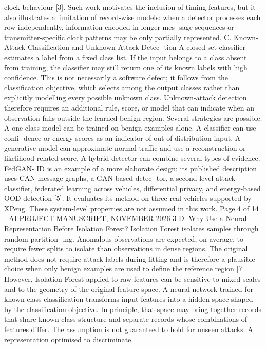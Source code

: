 \documentclass[
]{article}
\begin{document}
clock behaviour {[}3{]}. Such work motivates the inclusion of timing
features, but it also illustrates a limitation of record-wise models:
when a detector processes each row independently, information encoded in
longer mes- sage sequences or transmitter-specific clock patterns may be
only partially represented. C. Known-Attack Classification and
Unknown-Attack Detec- tion A closed-set classifier estimates a label
from a fixed class list. If the input belongs to a class absent from
training, the classifier may still return one of its known labels with
high confidence. This is not necessarily a software defect; it follows
from the classification objective, which selects among the output
classes rather than explicitly modelling every possible unknown class.
Unknown-attack detection therefore requires an additional rule, score,
or model that can indicate when an observation falls outside the learned
benign region. Several strategies are possible. A one-class model can be
trained on benign examples alone. A classifier can use confi- dence or
energy scores as an indicator of out-of-distribution input. A generative
model can approximate normal traffic and use a reconstruction or
likelihood-related score. A hybrid detector can combine several types of
evidence. FedGAN- ID is an example of a more elaborate design: its
published description uses CAN-message graphs, a GAN-based detec- tor, a
second-level attack classifier, federated learning across vehicles,
differential privacy, and energy-based OOD detection {[}5{]}. It
evaluates its method on three real vehicles supported by XPeng. These
system-level properties are not assumed in this work. Page 4 of 14 - AI
PROJECT MANUSCRIPT, NOVEMBER 2026 3 D. Why Use a Neural Representation
Before Isolation Forest? Isolation Forest isolates samples through
random partition- ing. Anomalous observations are expected, on average,
to require fewer splits to isolate than observations in dense regions.
The original method does not require attack labels during fitting and is
therefore a plausible choice when only benign examples are used to
define the reference region {[}7{]}. However, Isolation Forest applied
to raw features can be sensitive to mixed scales and to the geometry of
the original feature space. A neural network trained for known-class
classification transforms input features into a hidden space shaped by
the classification objective. In principle, that space may bring
together records that share known-class structure and separate records
whose combinations of features differ. The assumption is not guaranteed
to hold for unseen attacks. A representation optimised to discriminate
\end{document}
